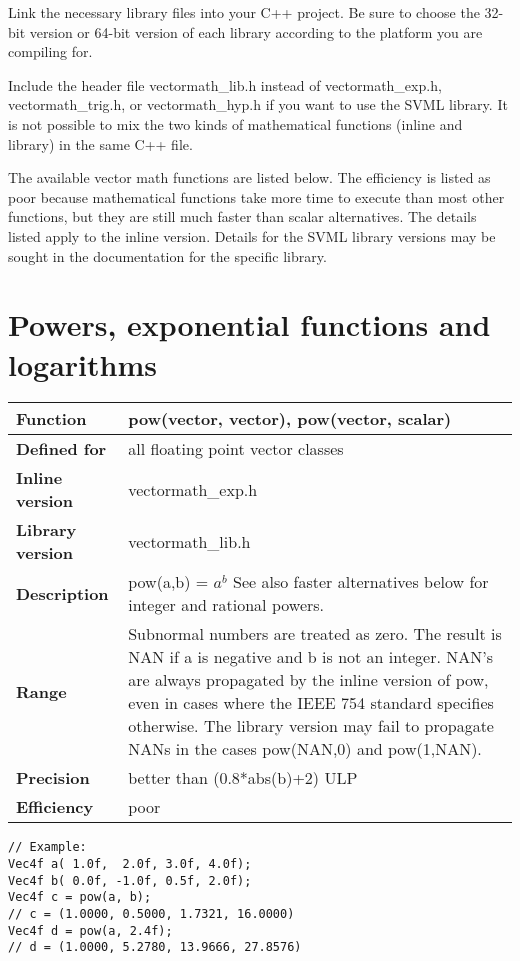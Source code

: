 \documentclass[vcl_manual.tex]{subfiles}
\begin{document}
Link the necessary library files into your C++ project. Be sure to choose the 32-bit version or 64-bit version of each library according to the platform you are compiling for.

Include the header file vectormath\_lib.h instead of vectormath\_exp.h, vectormath\_trig.h, or vectormath\_hyp.h if you want to use the SVML library. 
It is not possible to mix the two kinds of mathematical functions (inline and library) in the same C++ file.

The available vector math functions are listed below. The efficiency is listed as poor because mathematical functions take more time to execute than most other functions, but they are still much faster than scalar alternatives. The details listed apply to the inline version. Details for the SVML library versions may be sought in the documentation for the specific library.


\section{Powers, exponential functions and logarithms}\label{ExpLogFunctions}

\begin{tabular}{|p{30mm}|p{120mm}|}
\hline
\bfseries Function & pow(vector, vector), pow(vector, scalar) \\ \hline
\bfseries Defined for & all floating point vector classes \\ \hline
\bfseries Inline version & vectormath\_exp.h \\ \hline
\bfseries Library version & vectormath\_lib.h \\ \hline
\bfseries Description & pow(a,b) = $a^b$ \newline 
See also faster alternatives below for integer and rational powers. \\ \hline
\bfseries Range & Subnormal numbers are treated as zero. The result is NAN if a is negative and b is not an integer. NAN's are always propagated by the inline version of pow, even in cases where the IEEE 754 standard specifies otherwise. The library version may fail to propagate NANs in the cases pow(NAN,0) and pow(1,NAN). \\ \hline
\bfseries Precision & better than (0.8*abs(b)+2) ULP \\ \hline
\bfseries Efficiency & poor \\ \hline
\end{tabular}
\begin{lstlisting}[frame=none]
// Example:
Vec4f a( 1.0f,  2.0f, 3.0f, 4.0f);
Vec4f b( 0.0f, -1.0f, 0.5f, 2.0f);
Vec4f c = pow(a, b);
// c = (1.0000, 0.5000, 1.7321, 16.0000)
Vec4f d = pow(a, 2.4f);
// d = (1.0000, 5.2780, 13.9666, 27.8576)
\end{lstlisting}
\end{document}
